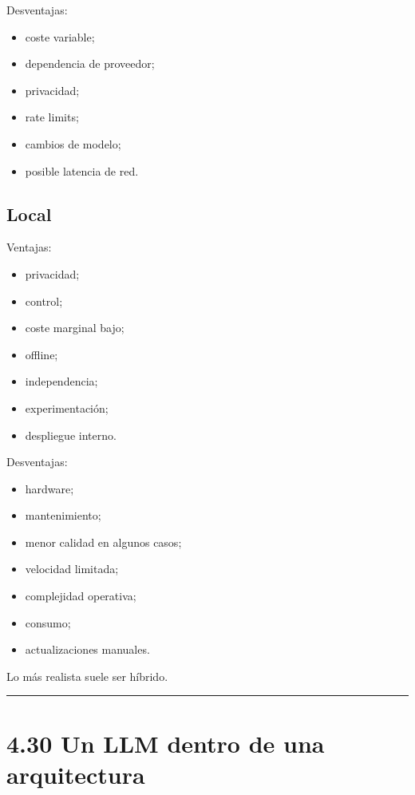 Desventajas:

\begin{itemize}
\tightlist
\item
  coste variable;
\item
  dependencia de proveedor;
\item
  privacidad;
\item
  rate limits;
\item
  cambios de modelo;
\item
  posible latencia de red.
\end{itemize}

\subsection{Local}\label{local}

Ventajas:

\begin{itemize}
\tightlist
\item
  privacidad;
\item
  control;
\item
  coste marginal bajo;
\item
  offline;
\item
  independencia;
\item
  experimentación;
\item
  despliegue interno.
\end{itemize}

Desventajas:

\begin{itemize}
\tightlist
\item
  hardware;
\item
  mantenimiento;
\item
  menor calidad en algunos casos;
\item
  velocidad limitada;
\item
  complejidad operativa;
\item
  consumo;
\item
  actualizaciones manuales.
\end{itemize}

Lo más realista suele ser híbrido.

\begin{center}\rule{0.5\linewidth}{0.5pt}\end{center}

\section{4.30 Un LLM dentro de una
arquitectura}\label{un-llm-dentro-de-una-arquitectura}

